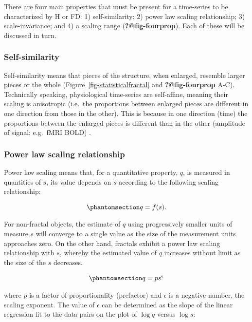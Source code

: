 \documentclass[
  sn-vancouver,
  Numbered,
  referee,
  lineno]{sn-jnl}
\begin{document}
There are four main properties that must be present for a time-series to
be characterized by H or FD: 1) self-similarity; 2) power law scaling
relationship; 3) scale-invariance; and 4) a scaling range
(\textbf{?@fig-fourprop}). Each of these will be discussed in turn.

\subsubsection{Self-similarity}\label{self-similarity}

Self-similarity means that pieces of the structure, when enlarged,
resemble larger pieces or the whole (Figure~\ref{fig-statisticalfractal}
and \textbf{?@fig-fourprop} A-C). Technically speaking, physiological
time-series are self-affine, meaning their scaling is anisotropic
(i.e.~the proportions between enlarged pieces are different in one
direction from those in the other). This is because in one direction
(time) the proportions between the enlarged pieces is different than in
the other (amplitude of signal; e.g.~fMRI BOLD)
\citep{ekePhysiologicalTimeSeries2000}.

\subsubsection{Power law scaling
relationship}\label{power-law-scaling-relationship}

Power law scaling means that, for a quantitative property, \(q\), is
measured in quantities of \(s\), its value depends on \(s\) according to
the following scaling relationship:

\begin{equation}\phantomsection\label{eq-qfs}{
q=f(s).
}\end{equation}

For non-fractal objects, the estimate of \(q\) using progressively
smaller units of measure \(s\) will converge to a single value as the
size of the measurement units approaches zero. On the other hand,
fractals exhibit a power law scaling relationship with \(s\), whereby
the estimated value of \(q\) increases without limit as the size of the
\(s\) decreases.

\begin{equation}\phantomsection\label{eq-powerlawscalingrelationship}{
q=ps^{\epsilon}
}\end{equation}

where \(p\) is a factor of proportionality (prefactor) and \(\epsilon\)
is a negative number, the scaling exponent. The value of \(\epsilon\)
can be determined as the slope of the linear regression fit to the data
pairs on the plot of \(\log{q}\) versus \(\log{s}\):
\end{document}
